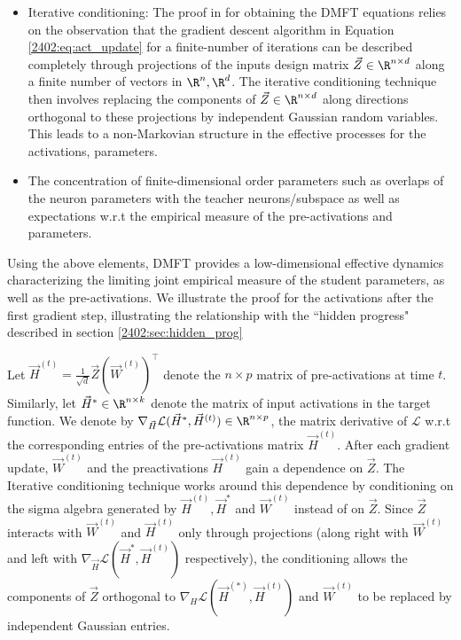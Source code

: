 \begin{itemize}
    \item[1.] Iterative conditioning: The proof in  \citep{gerbelot2022rigorous,montanari2022universality} for obtaining the DMFT equations relies on the observation that the gradient descent algorithm in Equation \eqref{2402:eq:act_update} for a finite-number of iterations can be described completely through projections of the inputs design matrix $\vec{Z} \in \R^{n \times d}$ along a finite number of vectors in $\R^n, \R^d$. The iterative conditioning technique \citep{bolthausen2014iterative,bayati2011dynamics} then involves replacing the components of $\vec{Z} \in \R^{n \times d}$ along directions orthogonal to these projections by independent Gaussian random variables. This leads to a non-Markovian structure in the effective processes for the activations, parameters. 
     \item[2.] The concentration of finite-dimensional order parameters such as overlaps of the neuron parameters with the teacher neurons/subspace as well as expectations w.r.t the empirical measure of the pre-activations and parameters. 
\end{itemize}

Using the above elements, DMFT provides a low-dimensional effective dynamics characterizing the limiting joint empirical measure of the student parameters, as well as the pre-activations. 
We illustrate the proof for the activations after the first gradient step, illustrating the relationship with the ``hidden progress" described in section \ref{2402:sec:hidden_prog}


Let $\vec{H}^{(t)} = \frac{1}{\sqrt{d}}\vec{Z}(\vec{W}^{(t)})^\top$ denote the $n \times p$ matrix of pre-activations at time $t$. Similarly, let $\vec{H}^* \in \R^{n\times k}$ denote the matrix of input activations in the target function. We denote by $\nabla_{\vec{H}} \mathcal{L}(\vec{H}^{*},\vec{H}^{(t)}) \in \R^{n \times p}$, the matrix derivative of $\mathcal{L}$ w.r.t the corresponding entries of the pre-activations matrix $\vec{H}^{(t)}$.
After each gradient update, $\vec{W}^{(t)}$ and the preactivations $\vec{H}^{(t)}$ gain a dependence on $\vec{Z}$.
 The Iterative conditioning technique works around this dependence by 
 conditioning on the sigma algebra generated by $\vec{H}^{(t)},\vec{H}^*$ and $\vec{W}^{(t)}$ instead of on $\vec{Z}$.
 Since $\vec{Z}$ interacts with $\vec{W}^{(t)}$ and 
$\vec{H}^{(t)}$ only through projections (along right with $\vec{W}^{(t)}$ and left with $\nabla_{\vec{H}} \mathcal{L}(\vec{H}^{*},\vec{H}^{(t)})$ respectively), the conditioning allows the components of $\vec{Z}$ orthogonal to $\nabla_H \mathcal{L}(\vec{H}^{(*)},\vec{H}^{(t)})$ and $\vec{W}^{(t)}$ to be replaced by independent Gaussian entries.  

